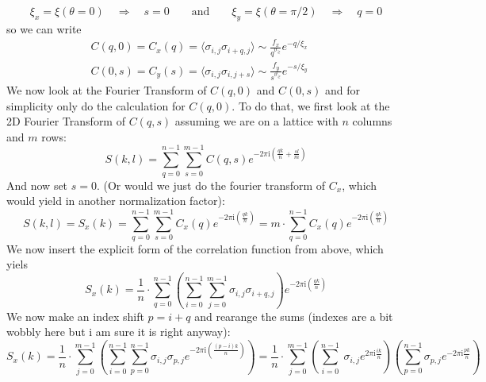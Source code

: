 	\begin{equation}
		\xi_x =	\xi(\theta = 0) \quad \Rightarrow \quad s =	0 \qquad \text{and} \qquad \xi_y = \xi(\theta = \pi /	2) \quad \Rightarrow \quad q = 0
	\end{equation}
	so we can write
	\begin{align}
		&C(q, 0) =	C_x(q) = \langle \sigma_{i,j} \sigma_{i +q ,j} \rangle \sim \frac{f_x}{q^{\vartheta_\gtrless}} 	e^{-q /	\xi_x} \qquad \\
		&C(0, s) =	C_y(s) =	\langle \sigma_{i,j} \sigma_{i ,j + s} \rangle \sim \frac{f_y}{s^{\vartheta_\gtrless}} 	e^{-s /	\xi_y} \qquad
	\end{align}
	We now look at the Fourier Transform of $C(q, 0)$ and $C(0, s)$ and for simplicity only do the calculation for $C(q, 0)$. To do that, we first look at the 2D Fourier Transform of $C(q, s)$ assuming we are on a lattice with $n$ columns and $m$ rows:
	\begin{equation}
		S(k, l) =	\sum_{q = 0}^{n-1} \sum_{s = 0}^{m-1} C(q, s) e^{-2\pi \mathrm{i} \left(\frac{qk}{n} + \frac{sl}{m}\right)}
	\end{equation}
	And now set $s=0$. (Or would we just do the fourier transform of $C_x$, which would yield in another normalization factor):
	\begin{equation}
		S(k, l) = S_x(k) =	\sum_{q = 0}^{n-1} \sum_{s = 0}^{m-1} C_x(q) e^{-2\pi \mathrm{i} \left(\frac{qk}{n}\right)} = m \cdot \sum_{q = 0}^{n-1} C_x(q) e^{-2\pi \mathrm{i} \left(\frac{qk}{n}\right)}
	\end{equation}
	We now insert the explicit form of the correlation function from above, which yiels
	\begin{equation}
		S_x(k) = \frac{1}{n} \cdot \sum_{q = 0}^{n-1} \left(\sum_{i = 0}^{n-1} \sum_{j =	0}^{m - 1} \sigma_{i,j} \sigma_{i +q ,j}\right) e^{-2\pi \mathrm{i} \left(\frac{qk}{n}\right)}
	\end{equation}
	We now make an index shift $p =	i + q$ and rearange the sums (indexes are a bit wobbly here but i am sure it is right anyway):
	\begin{equation}
		S_x(k) = \frac{1}{n} \cdot \sum_{j = 0}^{m-1} \left(\sum_{i = 0}^{n-1} \sum_{p = 0}^{n - 1} \sigma_{i,j} \sigma_{p ,j} e^{-2\pi \mathrm{i} \left(\frac{(p-i)k}{n}\right)} \right) =	 \frac{1}{n} \cdot \sum_{j = 0}^{m-1} \left(\sum_{i = 0}^{n-1} \ \sigma_{i,j} e^{2\pi \mathrm{i}\frac{ik}{n}} \right) \left( \sum_{p = 0}^{n - 1}\sigma_{p ,j} e^{-2\pi \mathrm{i} \frac{pk}{n}} \right)
	\end{equation}
